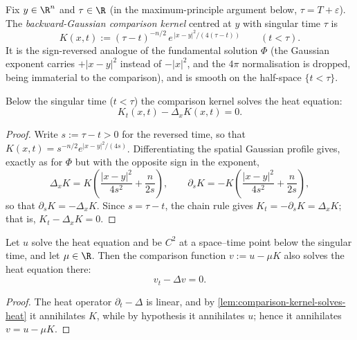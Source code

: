 \begin{definition}
\label{def:comparison-kernel}
\leanok
{}
Fix $y \in \R^n$ and $\tau \in \R$ (in the maximum-principle argument below, $\tau = T +
\varepsilon$). The \emph{backward-Gaussian comparison kernel} centred at $y$ with singular
time $\tau$ is
$$K(x,t) := (\tau - t)^{-n/2}\, e^{\,|x-y|^2 / (4(\tau - t))} \qquad (t < \tau).$$
It is the sign-reversed analogue of the fundamental solution $\Phi$ (the Gaussian exponent
carries $+|x-y|^2$ instead of $-|x|^2$, and the $4\pi$ normalisation is dropped, being
immaterial to the comparison), and is smooth on the half-space $\{t < \tau\}$.
\end{definition}

\begin{lemma}
\label{lem:comparison-kernel-solves-heat}
\leanok
{}
Below the singular time ($t < \tau$) the comparison kernel solves the heat equation:
$$K_t(x,t) - \Delta_x K(x,t) = 0.$$
\end{lemma}

\begin{proof}
\leanok
Write $s := \tau - t > 0$ for the reversed time, so that $K(x,t) = s^{-n/2}
e^{|x-y|^2/(4s)}$. Differentiating the spatial Gaussian profile gives, exactly as for
$\Phi$ but with the opposite sign in the exponent,
$$\Delta_x K = K\left(\frac{|x-y|^2}{4s^2} + \frac{n}{2s}\right), \qquad
  \partial_s K = -K\left(\frac{|x-y|^2}{4s^2} + \frac{n}{2s}\right),$$
so that $\partial_s K = -\Delta_x K$. Since $s = \tau - t$, the chain rule gives $K_t =
-\partial_s K = \Delta_x K$; that is, $K_t - \Delta_x K = 0$.
\end{proof}

\begin{lemma}
\label{lem:comparison-function-solves-heat}
\leanok
{}
Let $u$ solve the heat equation and be $C^2$ at a space--time point below the singular
time, and let $\mu \in \R$. Then the comparison function $v := u - \mu K$ also solves the
heat equation there:
$$v_t - \Delta v = 0.$$
\end{lemma}

\begin{proof}
\leanok
The heat operator $\partial_t - \Delta$ is linear, and by
\cref{lem:comparison-kernel-solves-heat} it annihilates $K$, while by hypothesis it
annihilates $u$; hence it annihilates $v = u - \mu K$.
\end{proof}

